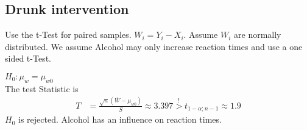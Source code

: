 \subsection{Drunk intervention}
Use the t-Test for paired samples. $W_i = Y_i-X_i$. Assume $W_i$ are normally distributed.
We assume Alcohol may only increase reaction times and use a one sided t-Test.
\par$H_0:\mu_w=\mu_{w0}$
\\The test Statistic is
\begin{align}
    T &= \frac{\sqrt{n}\left(\overline{W}-\mu_{w0}\right)}{S}\approx 3.397\overset{!}{>}t_{1-\alpha;n-1}\approx 1.9
\end{align}
$H_0$ is rejected. Alcohol has an influence on reaction times.